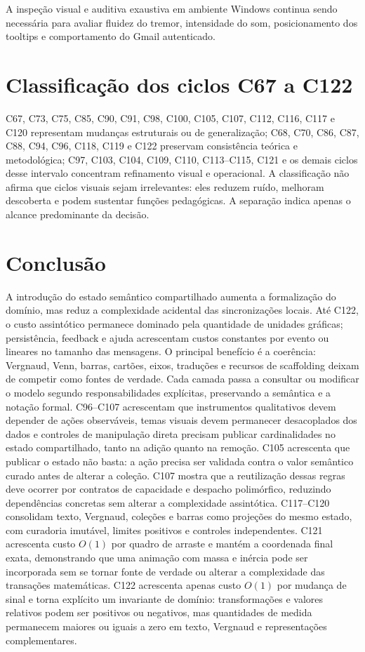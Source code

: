 \documentclass[12pt,a4paper]{article}
\begin{document}
A inspeção visual e auditiva exaustiva em ambiente Windows continua sendo necessária para avaliar fluidez do tremor, intensidade do som, posicionamento dos tooltips e comportamento do Gmail autenticado.

\section{Classificação dos ciclos C67 a C122}

C67, C73, C75, C85, C90, C91, C98, C100, C105, C107, C112, C116, C117 e C120 representam mudanças estruturais ou de generalização; C68, C70, C86, C87, C88, C94, C96, C118, C119 e C122 preservam consistência teórica e metodológica; C97, C103, C104, C109, C110, C113--C115, C121 e os demais ciclos desse intervalo concentram refinamento visual e operacional. A classificação não afirma que ciclos visuais sejam irrelevantes: eles reduzem ruído, melhoram descoberta e podem sustentar funções pedagógicas. A separação indica apenas o alcance predominante da decisão.

\section{Conclusão}

A introdução do estado semântico compartilhado aumenta a formalização do domínio, mas reduz a complexidade acidental das sincronizações locais. Até C122, o custo assintótico permanece dominado pela quantidade de unidades gráficas; persistência, feedback e ajuda acrescentam custos constantes por evento ou lineares no tamanho das mensagens. O principal benefício é a coerência: Vergnaud, Venn, barras, cartões, eixos, traduções e recursos de scaffolding deixam de competir como fontes de verdade. Cada camada passa a consultar ou modificar o modelo segundo responsabilidades explícitas, preservando a semântica e a notação formal. C96--C107 acrescentam que instrumentos qualitativos devem depender de ações observáveis, temas visuais devem permanecer desacoplados dos dados e controles de manipulação direta precisam publicar cardinalidades no estado compartilhado, tanto na adição quanto na remoção. C105 acrescenta que publicar o estado não basta: a ação precisa ser validada contra o valor semântico curado antes de alterar a coleção. C107 mostra que a reutilização dessas regras deve ocorrer por contratos de capacidade e despacho polimórfico, reduzindo dependências concretas sem alterar a complexidade assintótica. C117--C120 consolidam texto, Vergnaud, coleções e barras como projeções do mesmo estado, com curadoria imutável, limites positivos e controles independentes. C121 acrescenta custo $O(1)$ por quadro de arraste e mantém a coordenada final exata, demonstrando que uma animação com massa e inércia pode ser incorporada sem se tornar fonte de verdade ou alterar a complexidade das transações matemáticas. C122 acrescenta apenas custo $O(1)$ por mudança de sinal e torna explícito um invariante de domínio: transformações e valores relativos podem ser positivos ou negativos, mas quantidades de medida permanecem maiores ou iguais a zero em texto, Vergnaud e representações complementares.
\end{document}
